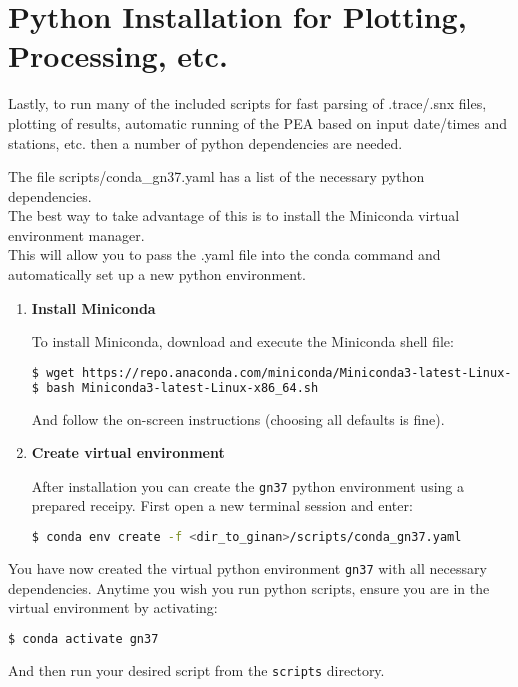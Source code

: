 \section{Python Installation for Plotting, Processing,
etc.}\label{python-installation-for-plotting-processing-etc.}

Lastly, to run many of the included scripts for fast parsing of
.trace/.snx files, plotting of results, automatic running of the PEA
based on input date/times and stations, etc. then a number of python
dependencies are needed.

The file scripts/conda\_gn37.yaml has a list of the necessary python
dependencies.\\
The best way to take advantage of this is to install the Miniconda
virtual environment manager.\\
This will allow you to pass the .yaml file into the conda command and
automatically set up a new python environment.

\begin{enumerate}
  \item\textbf{Install Miniconda}

To install Miniconda, download and execute the Miniconda shell file:

\begin{lstlisting}[language=bash]
$ wget https://repo.anaconda.com/miniconda/Miniconda3-latest-Linux-x86_64.sh
$ bash Miniconda3-latest-Linux-x86_64.sh
\end{lstlisting}

And follow the on-screen instructions (choosing all defaults is fine).

\item\textbf{Create virtual
environment}

After installation you can create the \texttt{gn37} python environment
using a prepared receipy. First open a new terminal session and enter:

\begin{lstlisting}[language=bash]
$ conda env create -f <dir_to_ginan>/scripts/conda_gn37.yaml
\end{lstlisting}

\end{enumerate}

You have now created the virtual python environment \texttt{gn37} with
all necessary dependencies. Anytime you wish you run python scripts,
ensure you are in the virtual environment by activating:

\begin{lstlisting}[language=bash]
$ conda activate gn37
\end{lstlisting}

And then run your desired script from the \texttt{scripts} directory.